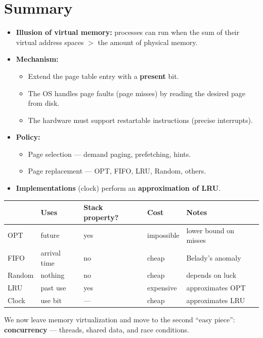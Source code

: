 \documentclass[11pt,a4paper]{article}
\begin{document}
\section{Summary}

\begin{keybox}[Conclusions]
\begin{itemize}
  \item \textbf{Illusion of virtual memory:} processes can run when the
        sum of their virtual address spaces \(>\) the amount of physical
        memory.
  \item \textbf{Mechanism:}
        \begin{itemize}
          \item Extend the page table entry with a \textbf{present} bit.
          \item The OS handles page faults (page misses) by reading the
                desired page from disk.
          \item The hardware must support restartable instructions
                (precise interrupts).
        \end{itemize}
  \item \textbf{Policy:}
        \begin{itemize}
          \item Page selection --- demand paging, prefetching, hints.
          \item Page replacement --- OPT, FIFO, LRU, Random, others.
        \end{itemize}
  \item \textbf{Implementations} (clock) perform an
        \textbf{approximation of LRU}.
\end{itemize}
\end{keybox}

\begin{center}
\renewcommand{\arraystretch}{1.18}
\begin{tabular}{@{}lllll@{}}
  \toprule
  & \textbf{Uses} & \textbf{Stack property?} & \textbf{Cost} & \textbf{Notes} \\
  \midrule
  OPT    & future       & yes & impossible & lower bound on misses \\
  FIFO   & arrival time & no  & cheap      & Belady's anomaly \\
  Random & nothing      & no  & cheap      & depends on luck \\
  LRU    & past use     & yes & expensive  & approximates OPT \\
  Clock  & use bit      & ---  & cheap      & approximates LRU \\
  \bottomrule
\end{tabular}
\end{center}

\begin{warnbox}
We now leave memory virtualization and move to the second ``easy
piece'': \textbf{concurrency} --- threads, shared data, and race conditions.
\end{warnbox}
\end{document}
